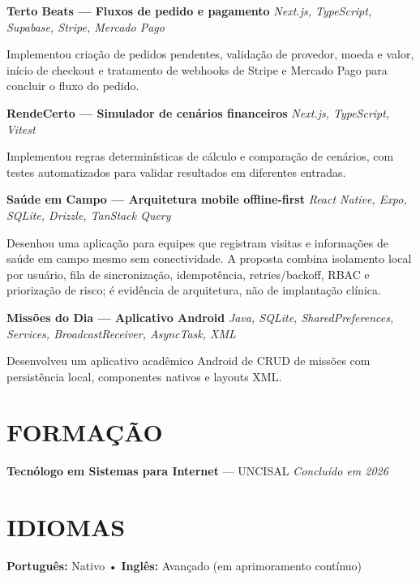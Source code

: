 \documentclass[10pt,a4paper]{article}
\begin{document}
\noindent
\textbf{Terto Beats — Fluxos de pedido e pagamento}
\hfill
\textit{Next.js, TypeScript, Supabase, Stripe, Mercado Pago}

\footnotesize

Implementou criação de pedidos pendentes, validação de provedor, moeda e valor, início de checkout e tratamento de webhooks de Stripe e Mercado Pago para concluir o fluxo do pedido.

\vspace{0.5pt}

\noindent
\textbf{RendeCerto — Simulador de cenários financeiros}
\hfill
\textit{Next.js, TypeScript, Vitest}

\footnotesize

Implementou regras determinísticas de cálculo e comparação de cenários, com testes automatizados para validar resultados em diferentes entradas.

\vspace{0.5pt}

\noindent
\textbf{Saúde em Campo — Arquitetura mobile offline-first}
\hfill
\textit{React Native, Expo, SQLite, Drizzle, TanStack Query}

\footnotesize

Desenhou uma aplicação para equipes que registram visitas e informações de saúde em campo mesmo sem conectividade. A proposta combina isolamento local por usuário, fila de sincronização, idempotência, retries/backoff, RBAC e priorização de risco; é evidência de arquitetura, não de implantação clínica.

\vspace{0.5pt}

\noindent
\textbf{Missões do Dia — Aplicativo Android}
\hfill
\textit{Java, SQLite, SharedPreferences, Services, BroadcastReceiver, AsyncTask, XML}

\footnotesize

Desenvolveu um aplicativo acadêmico Android de CRUD de missões com persistência local, componentes nativos e layouts XML.


\section*{FORMAÇÃO}

\noindent
\textbf{Tecnólogo em Sistemas para Internet} — UNCISAL
\hfill
\textit{Concluído em 2026}


\vspace{-2pt}
\section*{IDIOMAS}

\noindent
\textbf{Português:} Nativo
\quad • \quad
\textbf{Inglês:} Avançado (em aprimoramento contínuo)
\end{document}
